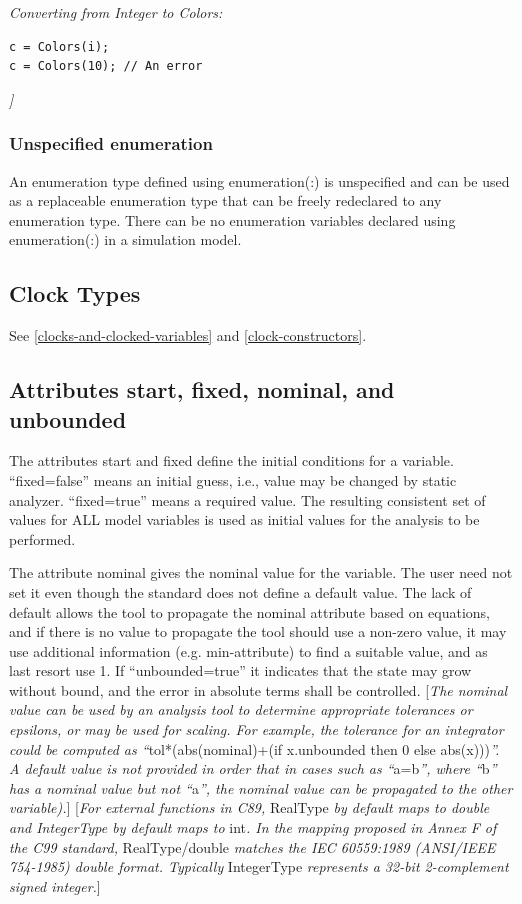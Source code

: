 \documentclass[10pt,a4paper]{report}
\def\doublelabel#1{\label{#1}\hypertarget{#1}{}}
\begin{document}
\emph{Converting from Integer to Colors: }
\begin{lstlisting}[language=Modelica]
c = Colors(i);
c = Colors(10); // An error
\end{lstlisting}

\emph{{]}}

\subsubsection{Unspecified enumeration}\doublelabel{unspecified-enumeration}

An enumeration type defined using enumeration(:) is unspecified and can
be used as a replaceable enumeration type that can be freely redeclared
to any enumeration type. There can be no enumeration variables declared
using enumeration(:) in a simulation model.

\subsection{Clock Types}\doublelabel{clock-types}

See \ref{clocks-and-clocked-variables} and \ref{clock-constructors}.

\subsection{Attributes start, fixed, nominal, and unbounded}\doublelabel{attributes-start-fixed-nominal-and-unbounded}

The attributes start and fixed define the initial conditions for a
variable. ``fixed=false'' means an initial guess, i.e., value may be
changed by static analyzer. ``fixed=true'' means a required value. The
resulting consistent set of values for ALL model variables is used as
initial values for the analysis to be performed.

The attribute nominal gives the nominal value for the variable. The user
need not set it even though the standard does not define a default
value. The lack of default allows the tool to propagate the nominal
attribute based on equations, and if there is no value to propagate the
tool should use a non-zero value, it may use additional information
(e.g. min-attribute) to find a suitable value, and as last resort use 1.
If ``unbounded=true'' it indicates that the state may grow without
bound, and the error in absolute terms shall be controlled. {[}\emph{The
nominal value can be used by an analysis tool to determine appropriate
tolerances or epsilons, or may be used for scaling. For example, the
tolerance for an integrator could be computed as
``}tol*(abs(nominal)+(if x.unbounded then 0 else abs(x)))\emph{''. A
default value is not provided in order that in cases such as
``}a=b\emph{'', where ``}b\emph{'' has a nominal value but not
``}a\emph{'', the nominal value can be propagated to the other
variable).}{]} {[}\emph{For external functions in C89,} RealType
\emph{by default maps to double and IntegerType by default maps to}
int\emph{. In the mapping proposed in Annex F of the C99 standard,}
RealType/double \emph{matches the IEC 60559:1989 (ANSI/IEEE 754-1985)
double format. Typically} IntegerType \emph{represents a 32-bit
2-complement signed integer.}{]}
\end{document}
